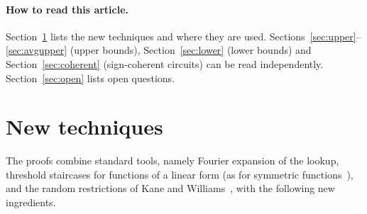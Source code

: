 \documentclass[11pt,letterpaper]{article}
\theoremstyle{remark}
\begin{document}
\paragraph*{How to read this article.}
Section~\ref{sec:tech} lists the new techniques and where they are
used. Sections~\ref{sec:upper}--\ref{sec:avgupper} (upper bounds),
Section~\ref{sec:lower} (lower bounds) and Section~\ref{sec:coherent}
(sign-coherent circuits) can be read independently. Section~\ref{sec:open} lists open questions.

\section{New techniques}\label{sec:tech}

The proofs combine standard tools, namely Fourier expansion of the lookup,
threshold staircases for functions of a linear form (as for symmetric
functions~\cite[Prop.~2.1]{HMPST}),
and the random restrictions of Kane and Williams~\cite{KW}, with the following
new ingredients.
\end{document}
